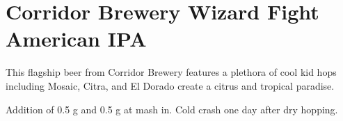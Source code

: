 \documentclass[10pt,oneside]{scrbook}
\begin{document}
\begin{ingredientsblock}

\begin{malts}
\end{malts}

\begin{hops}

\end{hops}

\begin{yeasts}
\end{yeasts}

\end{ingredientsblock}

\chapter*{Corridor Brewery Wizard Fight American IPA}

\begin{aboutblock}
This flagship beer from Corridor Brewery features a plethora of cool kid hops
including Mosaic, Citra, and El Dorado create a citrus and tropical paradise.
\end{aboutblock}


\begin{methodandtiming}
 
\begin{mashsteps}
\end{mashsteps}

\begin{fermentationsteps}
\end{fermentationsteps}

\begin{directions}
Addition of 0.5 g  and 0.5 g  at mash in. Cold crash one
day after dry hopping.
\end{directions}

\end{methodandtiming}
\end{document}
